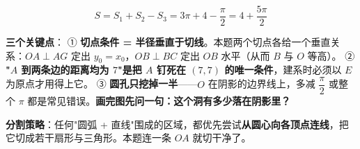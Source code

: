 \begin{answer}
\nopagebreak[4]
\[S=S_1+S_2-S_3=3\pi+4-\frac\pi2=4+\frac{5\pi}2\]

\begin{gktip}
\textbf{三个关键点}：
① \textbf{切点条件 = 半径垂直于切线}。本题两个切点各给一个垂直关系：$OA\perp AG$ 定出 $y_0=x_0$，$OB\perp BC$ 定出 $OB$ 水平（从而 $B$ 与 $O$ 等高）。
② \textbf{"$A$ 到两条边的距离均为 $7$"是把 $A$ 钉死在 $(7,7)$ 的唯一条件}，建系时必须以 $E$ 为原点才用得上它。
③ \textbf{圆孔只挖掉一半}——$O$ 在阴影的边界线上，多减 $\dfrac\pi2$ 或整个 $\pi$ 都是常见错误。\textbf{画完图先问一句：这个洞有多少落在阴影里？}

\textbf{分割策略}：任何"圆弧 + 直线"围成的区域，都优先尝试\textbf{从圆心向各顶点连线}，把它切成若干扇形与三角形。本题连一条 $OA$ 就切干净了。
\end{gktip}


\par\medskip

\end{answer}

